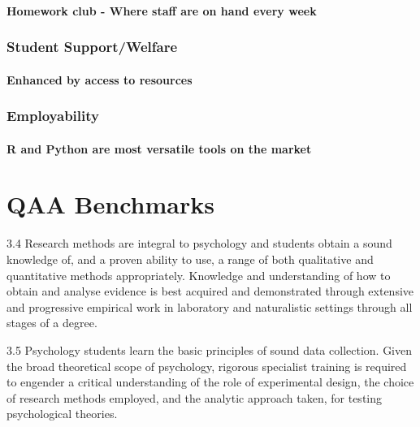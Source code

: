 \documentclass[
  11pt,
  letterpaper,
  oneside,
  open=any]{scrbook}
\begin{document}
\hypertarget{homework-club---where-staff-are-on-hand-every-week}{%
\subsubsection{Homework club - Where staff are on hand every
week}\label{homework-club---where-staff-are-on-hand-every-week}}

\hypertarget{student-supportwelfare}{%
\subsection{Student Support/Welfare}\label{student-supportwelfare}}

\hypertarget{enhanced-by-access-to-resources}{%
\subsubsection{Enhanced by access to
resources}\label{enhanced-by-access-to-resources}}

\hypertarget{employability}{%
\subsection{Employability}\label{employability}}

\hypertarget{r-and-python-are-most-versatile-tools-on-the-market}{%
\subsubsection{R and Python are most versatile tools on the
market}\label{r-and-python-are-most-versatile-tools-on-the-market}}


\hypertarget{qaa-benchmarks}{%
\chapter{QAA Benchmarks}\label{qaa-benchmarks}}

3.4 Research methods are integral to psychology and students obtain a
sound knowledge of, and a proven ability to use, a range of both
qualitative and quantitative methods appropriately. Knowledge and
understanding of how to obtain and analyse evidence is best acquired and
demonstrated through extensive and progressive empirical work in
laboratory and naturalistic settings through all stages of a degree.

3.5 Psychology students learn the basic principles of sound data
collection. Given the broad theoretical scope of psychology, rigorous
specialist training is required to engender a critical understanding of
the role of experimental design, the choice of research methods
employed, and the analytic approach taken, for testing psychological
theories.
\end{document}
